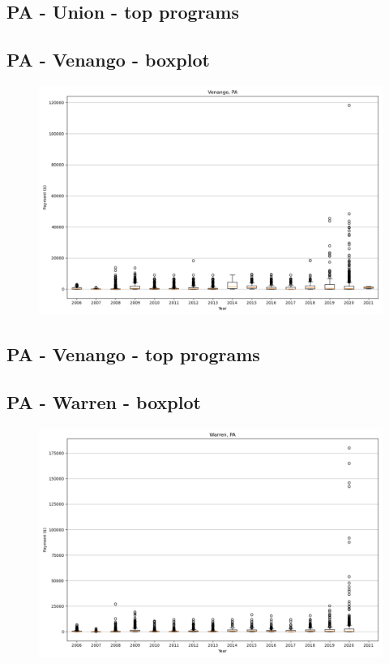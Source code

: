 \subsection*{PA - Union - top programs}

\newpage
\subsection*{PA - Venango - boxplot}
\begin{figure}[h]
\centering
\includegraphics[width=7in]{../output/boxplots/counties/Venango-PA_boxplot.png}
\end{figure}


\subsection*{PA - Venango - top programs}

\newpage
\subsection*{PA - Warren - boxplot}
\begin{figure}[h]
\centering
\includegraphics[width=7in]{../output/boxplots/counties/Warren-PA_boxplot.png}
\end{figure}


